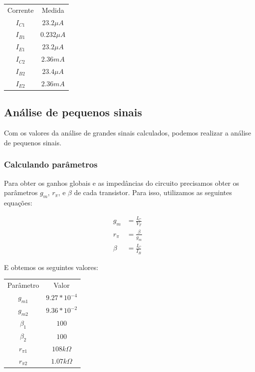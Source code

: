 \begin{center}
    \begin{tabular}{ |c|c| }
        \hline
        Corrente & Medida        \\
        $I_{C1}$ & $23.2 \mu A$  \\
        $I_{B1}$ & $0.232 \mu A$ \\
        $I_{E1}$ & $23.2 \mu A$  \\
        $I_{C2}$ & $2.36 mA$     \\
        $I_{B2}$ & $23.4 \mu A$  \\
        $I_{E2}$ & $2.36 mA$     \\
        \hline
    \end{tabular}
\end{center}

\subsection{Análise de pequenos sinais}

Com os valores da análise de grandes sinais calculados, podemos realizar a análise de pequenos sinais.

\subsubsection{Calculando parâmetros}

Para obter os ganhos globais e as impedâncias do circuito precisamos obter os parâmetros $g_m$, $r_{\pi}$, e $\beta$ de cada transistor. Para isso, utilizamos as seguintes equações:

\begin{equation}
    \begin{aligned}
        g_m     & = \frac{I_C}{V_T}   \\
        r_{\pi} & = \frac{\beta}{g_m} \\
        \beta   & = \frac{I_C}{I_B}
    \end{aligned}
\end{equation}

E obtemos os seguintes valores:

\begin{center}
    \begin{tabular}{ |c|c| }
        \hline
        Parâmetro   & Valor               \\
        $g_{m1}$    & $9.27 * 10^{-4}$    \\
        $g_{m2}$    & $9.36 * 10^{-2}$    \\
        $\beta_1$   & $100$               \\
        $\beta_2$   & $100$               \\
        $r_{\pi 1}$ & $108 k \varOmega  $ \\
        $r_{\pi 2}$ & $1.07 k \varOmega$  \\
        \hline
    \end{tabular}
\end{center}

